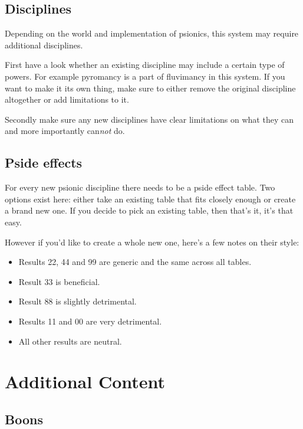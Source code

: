 \documentclass[12pt,a4paper,openany]{book}
\begin{document}
	\section{Disciplines}
	Depending on the world and implementation of psionics, this system may require additional disciplines.\par
	First have a look whether an existing discipline may include a certain type of powers. For example pyromancy is a part of fluvimancy in this system. If you want to make it its own thing, make sure to either remove the original discipline altogether or add limitations to it.\par
	Secondly make sure any new disciplines have clear limitations on what they can and more importantly can\emph{not} do.
	\section{Pside effects}
	For every new psionic discipline there needs to be a pside effect table. Two options exist here: either take an existing table that fits closely enough or create a brand new one. If you decide to pick an existing table, then that's it, it's that easy.\par
	However if you'd like to create a whole new one, here's a few notes on their style:
	\begin{itemize}
		\item Results 22, 44 and 99 are generic and the same across all tables.
		\item Result 33 is beneficial.
		\item Result 88 is slightly detrimental.
		\item Results 11 and 00 are very detrimental.
		\item All other results are neutral.
	\end{itemize}

	\chapter{Additional Content}
	\label{ch:addcontent}
	\section{Boons}
\end{document}
